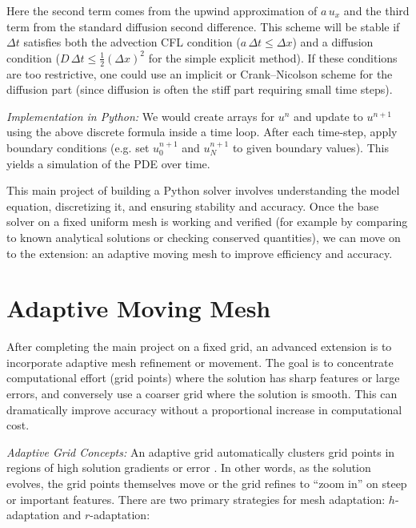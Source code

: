 \documentclass{adonis}
\begin{document}
Here the second term comes from the upwind approximation of $a\,u_x$ and the third term from the standard diffusion second difference. This scheme will be stable if $\Delta t$ satisfies both the advection CFL condition ($a\,\Delta t \le \Delta x$) and a diffusion condition ($D\,\Delta t \le \frac{1}{2}(\Delta x)^2$ for the simple explicit method). If these conditions are too restrictive, one could use an implicit or Crank–Nicolson scheme for the diffusion part (since diffusion is often the stiff part requiring small time steps).

\textit{Implementation in Python:} We would create arrays for $u^n$ and update to $u^{n+1}$ using the above discrete formula inside a time loop. After each time-step, apply boundary conditions (e.g. set $u^{n+1}_0$ and $u^{n+1}_N$ to given boundary values). This yields a simulation of the PDE over time. 

This main project of building a Python solver involves understanding the model equation, discretizing it, and ensuring stability and accuracy. Once the base solver on a fixed uniform mesh is working and verified (for example by comparing to known analytical solutions or checking conserved quantities), we can move on to the extension: an adaptive moving mesh to improve efficiency and accuracy.

\section{Adaptive Moving Mesh}

After completing the main project on a fixed grid, an advanced extension is to incorporate adaptive mesh refinement or movement. The goal is to concentrate computational effort (grid points) where the solution has sharp features or large errors, and conversely use a coarser grid where the solution is smooth. This can dramatically improve accuracy without a proportional increase in computational cost.

\textit{Adaptive Grid Concepts:} An adaptive grid automatically clusters grid points in regions of high solution gradients or error . In other words, as the solution evolves, the grid points themselves move or the grid refines to “zoom in” on steep or important features. There are two primary strategies for mesh adaptation: $h$-adaptation and $r$-adaptation:
\end{document}
